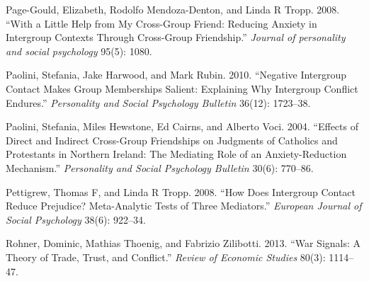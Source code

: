 \documentclass[11pt]{article}
\begin{document}
\leavevmode\hypertarget{ref-page2008little}{}%
Page-Gould, Elizabeth, Rodolfo Mendoza-Denton, and Linda R Tropp. 2008.
``With a Little Help from My Cross-Group Friend: Reducing Anxiety in
Intergroup Contexts Through Cross-Group Friendship.'' \emph{Journal of
personality and social psychology} 95(5): 1080.

\leavevmode\hypertarget{ref-paolini2010negative}{}%
Paolini, Stefania, Jake Harwood, and Mark Rubin. 2010. ``Negative
Intergroup Contact Makes Group Memberships Salient: Explaining Why
Intergroup Conflict Endures.'' \emph{Personality and Social Psychology
Bulletin} 36(12): 1723--38.

\leavevmode\hypertarget{ref-paolini2004effects}{}%
Paolini, Stefania, Miles Hewstone, Ed Cairns, and Alberto Voci. 2004.
``Effects of Direct and Indirect Cross-Group Friendships on Judgments of
Catholics and Protestants in Northern Ireland: The Mediating Role of an
Anxiety-Reduction Mechanism.'' \emph{Personality and Social Psychology
Bulletin} 30(6): 770--86.

\leavevmode\hypertarget{ref-pettigrew2008does}{}%
Pettigrew, Thomas F, and Linda R Tropp. 2008. ``How Does Intergroup
Contact Reduce Prejudice? Meta-Analytic Tests of Three Mediators.''
\emph{European Journal of Social Psychology} 38(6): 922--34.

\leavevmode\hypertarget{ref-rohner2013war}{}%
Rohner, Dominic, Mathias Thoenig, and Fabrizio Zilibotti. 2013. ``War
Signals: A Theory of Trade, Trust, and Conflict.'' \emph{Review of
Economic Studies} 80(3): 1114--47.
\end{document}
